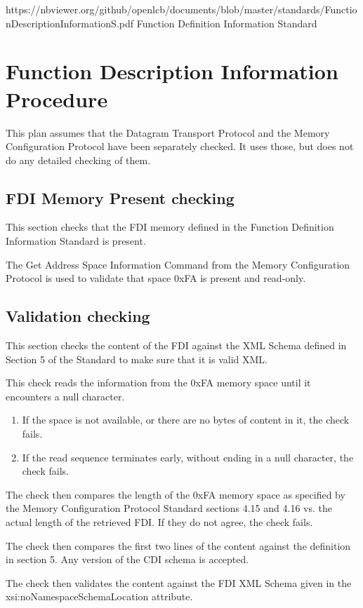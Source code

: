 



\maketitle
\thispagestyle{firststyle}

\introductionCaveats
    {https://nbviewer.org/github/openlcb/documents/blob/master/standards/FunctionDescriptionInformationS.pdf}
    {Function Definition Information Standard}

\section{Function Description Information Procedure}


This plan assumes that the Datagram Transport Protocol and the Memory Configuration Protocol 
have been separately checked. It uses those, but does not do any detailed checking of them.

\subsection{FDI Memory Present checking}

This section checks that the FDI memory defined in the Function 
Definition Information Standard is present.

The Get Address Space Information Command from the Memory Configuration Protocol
is used to validate that space 0xFA is present and read-only.

\subsection{Validation checking}

This section checks the content of the FDI against the XML Schema 
defined in Section 5 of the Standard to make sure that it is valid XML. 

This check reads the information from the 0xFA memory space
until it encounters a null character.
\begin{enumerate}
\item If the space is not available, or there are no bytes of content in it, the check fails.
\item If the read sequence terminates early, without ending in a null character, the check fails.
\end{enumerate}
 
The check then compares the length of the 0xFA memory space 
as specified by the Memory Configuration Protocol Standard sections 4.15 and 4.16
vs. the actual length of the retrieved FDI.
If they do not agree, the check fails.

The check then compares the first two lines of the content against the 
definition in section 5. 
Any version of the CDI schema is accepted.

The check then validates the content against the FDI XML Schema
given in the xsi:noNamespaceSchemaLocation attribute.

  
